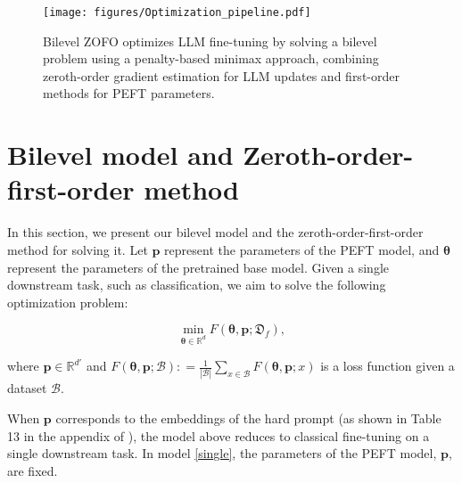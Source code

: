 \begin{figure}[!t] 
    \centering
    \texttt{[image: figures/Optimization\_pipeline.pdf]}
    \caption{Bilevel ZOFO optimizes LLM fine-tuning by solving a bilevel problem using a penalty-based minimax approach, combining zeroth-order gradient estimation for LLM updates and first-order methods for PEFT parameters.}
    \label{fig:pipeline}
\end{figure}

\section{Bilevel model and Zeroth-order-first-order method }
In this section, we present our bilevel model and the zeroth-order-first-order method for solving it. Let { $\mathbf{p}$} represent the parameters of the PEFT model, and { $\bm{\theta}$} represent the parameters of the pretrained base model. Given a single downstream task, such as classification, we aim to solve the following optimization problem:

\begin{equation}\label{single}
\min_{{ \bm{\theta}}\in \mathbb{R}^d} F({ \bm{\theta}}, { \mathbf{p}};\mathfrak{D}_f),
\end{equation}

where ${ \mathbf{p}}\in \mathbb{R}^{d'}$ and $F({ \bm{\theta}}, { \mathbf{p}};\mathcal{B}): = \frac{1}{|\mathcal{B}|} \sum_{x\in \mathcal{B}}F({ \bm{\theta}}, { \mathbf{p}};x)$ is a loss function given a dataset $\mathcal{B}$. 


When ${ \mathbf{p}}$ corresponds to the embeddings of the hard prompt (as shown in Table 13 in the appendix of \cite{MalladiGNDL0A23Mezo}), the model above reduces to classical fine-tuning on a single downstream task. In model \eqref{single}, the parameters of the PEFT model, ${ \mathbf{p}}$, are fixed.

